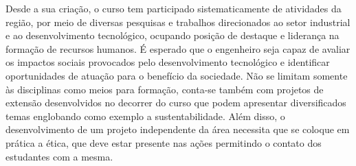 Desde a sua criação, o curso tem participado sistematicamente de atividades da região, por meio de diversas pesquisas e trabalhos direcionados ao setor industrial e ao desenvolvimento tecnológico, ocupando posição de destaque e liderança na formação de recursos humanos. É esperado que o engenheiro seja capaz de avaliar os impactos sociais provocados pelo desenvolvimento tecnológico e identificar oportunidades de atuação para o benefício da sociedade. Não se limitam somente às disciplinas como meios para formação, conta-se também com projetos de extensão desenvolvidos no decorrer do curso que podem apresentar diversificados temas englobando como exemplo a sustentabilidade.  Além disso, o desenvolvimento de um projeto independente da área necessita que se coloque em prática a ética, que deve estar presente nas ações permitindo o contato dos estudantes com a mesma.
